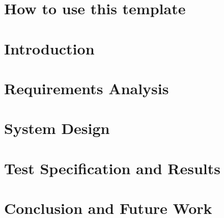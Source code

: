 \documentclass{lincolncsuthesis}
\begin{document}
\maketitle







\thesisTables
\thesisBodyStart





\chapter{How to use this template}


\chapter{Introduction}


\chapter{Requirements Analysis}


\chapter{System Design}


\chapter{Test Specification and Results}


\chapter{Conclusion and Future Work}

\end{document}
